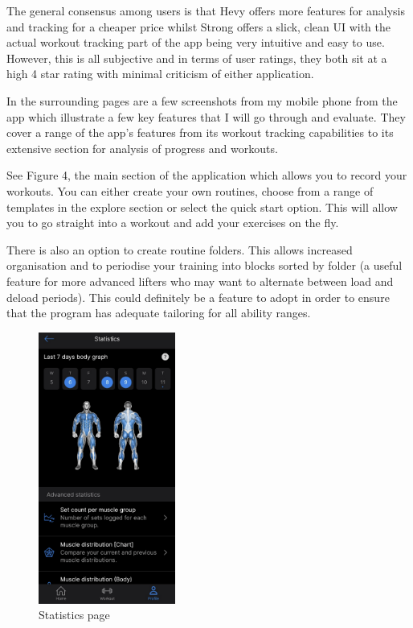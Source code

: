 \documentclass{article}
\begin{document}
The general consensus among users is that Hevy offers more features for analysis and tracking for a cheaper price whilst Strong offers a slick, clean UI with the actual workout tracking part of the app being very intuitive and easy to use. However, this is all subjective and in terms of user ratings, they both sit at a high 4 star rating with minimal criticism of either application.

In the surrounding pages are a few screenshots from my mobile phone from the app which illustrate a few key features that I will go through and evaluate. They cover a range of the app’s features from its workout tracking capabilities to its extensive section for analysis of progress and workouts. 

See Figure 4, the main section of the application which allows you to record your workouts. You can either create your own routines, choose from a range of templates in the explore section or select the quick start option. This will allow you to go straight into a workout and add your exercises on the fly. 

There is also an option to create routine folders. This allows increased organisation and to periodise your training into blocks sorted by folder (a useful feature for more advanced lifters who may want to alternate between load and deload periods). This could definitely be a feature to adopt in order to ensure that the program has adequate tailoring for all ability ranges. 

\begin{figure}
  \centering
  \includegraphics[width=0.4\textwidth]{Figure 5.png}
  \caption{Statistics page}
\end{figure}
\end{document}
